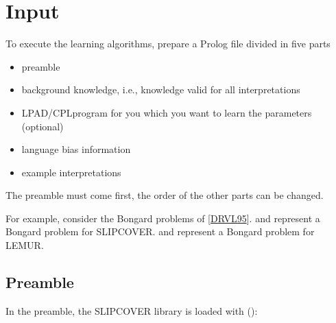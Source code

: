 \documentclass[letterpaper,10pt,english]{sphinxmanual}
\begin{document}
\section{Input}
\label{\detokenize{index:input}}
\sphinxAtStartPar
To execute the learning algorithms, prepare a Prolog file divided in five parts
\begin{itemize}
\item {} 
\sphinxAtStartPar
preamble

\item {} 
\sphinxAtStartPar
background knowledge, i.e., knowledge valid for all interpretations

\item {} 
\sphinxAtStartPar
LPAD/CPL\sphinxhyphen{}program for you which you want to learn the parameters (optional)

\item {} 
\sphinxAtStartPar
language bias information

\item {} 
\sphinxAtStartPar
example interpretations

\end{itemize}

\sphinxAtStartPar
The preamble must come first, the order of the other parts can be changed.

\sphinxAtStartPar
For example, consider the Bongard problems of {[}\hyperlink{cite.index:id67}{DRVL95}{]}.  and  represent a Bongard problem for SLIPCOVER.
 and  represent a Bongard problem for LEMUR.


\subsection{Preamble}
\label{\detokenize{index:preamble}}
\sphinxAtStartPar
In the preamble, the SLIPCOVER library is loaded with ():

\begin{sphinxVerbatim}[commandchars=\\\{\}]
 
\end{sphinxVerbatim}
\end{document}
